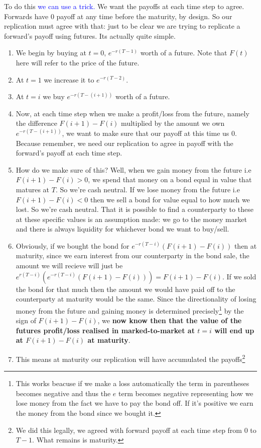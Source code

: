 \documentclass[9pt]{extarticle}
\begin{document}
To do this \textcolor{blue}{we can use a trick.} We want the payoffs at each time step to agree. Forwards have 0 payoff at any time before the 
maturity, by design. So our replication must agree with that: just to be clear 
we are trying to replicate a forward's payoff using futures. Its actually quite simple. 
\begin{enumerate}
  \item We begin by buying at $t=0$, $e^{-r(T-1)}$ worth of a future. Note that $F(t)$ here will refer to the price of the future.
  \item At $t=1$ we increase it to $e^{-r(T-2)}$.
  \item At $t=i$ we buy $e^{-r(T-(i+1))}$ worth of a future.
  \item Now, at each time step when we make a profit/loss from the future, namely the difference 
  $F(i+1)-F(i)$ multiplied by the amount we own $e^{-r(T-(i+1))}$, we want to make sure that our payoff at this time 
  us 0. Because remember, we need our replication to agree in payoff with the forward's payoff at each time step.
  \item How do we make sure of this? Well, when we gain money from the future i.e $F(i+1)-F(i)>0$, we 
  spend that money on a bond equal in value that matures at $T$. So we're cash neutral. If we lose money from 
  the future i.e $F(i+1)-F(i)<0$ then we sell a bond for value equal to how much we lost. So we're cash neutral. That it is possible to find 
  a counterparty to these at these specific values is an assumption made: we go to the money market and there is always liquidity for whichever
  bond we want to buy/sell.
  \item Obviously, if we bought the bond for $e^{-r(T-i)}(F(i+1)-F(i))$ then at maturity, since 
  we earn interest from our counterparty in the bond sale, the amount we will recieve will just 
  be $e^{r(T-i)}(e^{-r(T-i)}(F(i+1)-F(i)))=F(i+1)-F(i)$. If we sold the bond for that much then the amount 
  we would have paid off to the counterparty at maturity would be the same. Since the directionality of losing money from 
  the future and gaining money is determined precisely\footnote{This works beacuse if we make a loss automatically the term in parentheses becomes negative and thus 
the $e$ term becomes negative representing how we lose money from the fact we have to pay the bond off. If it's 
positive we earn the money from the bond since we bought it.} by the sign of $F(i+1)-F(i)$, we \textbf{now know then that 
the value of the futures profit/loss realised in marked-to-market at $t=i$ will end up at $F(i+1)-F(i)$ at maturity}.
\item This means at maturity our replication will have accumulated the payoffs\footnote{We did this legally, we agreed with forward 
payoff at each time step from $0$ to $T-1$. What remains is maturity.}


\end{enumerate}
\end{document}
